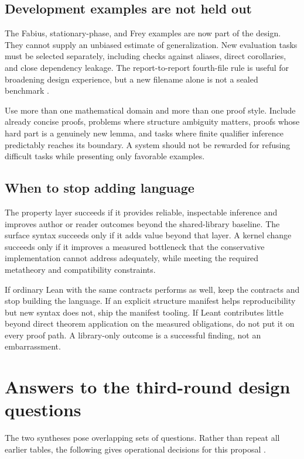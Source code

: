 \documentclass[11pt,a4paper]{article}
\theoremstyle{definition}
\theoremstyle{remark}
\begin{document}
\subsection{Development examples are not held out}
The Fabius, stationary-phase, and Frey examples are now part of the design. They cannot supply an unbiased estimate of generalization. New evaluation tasks must be selected separately, including checks against aliases, direct corollaries, and close dependency leakage. The report-to-report fourth-file rule is useful for broadening design experience, but a new filename alone is not a sealed benchmark \cite{synA,synB}.

Use more than one mathematical domain and more than one proof style. Include already concise proofs, problems where structure ambiguity matters, proofs whose hard part is a genuinely new lemma, and tasks where finite qualifier inference predictably reaches its boundary. A system should not be rewarded for refusing difficult tasks while presenting only favorable examples.

\subsection{When to stop adding language}
The property layer succeeds if it provides reliable, inspectable inference and improves author or reader outcomes beyond the shared-library baseline. The surface syntax succeeds only if it adds value beyond that layer. A kernel change succeeds only if it improves a measured bottleneck that the conservative implementation cannot address adequately, while meeting the required metatheory and compatibility constraints.

If ordinary Lean with the same contracts performs as well, keep the contracts and stop building the language. If an explicit structure manifest helps reproducibility but new syntax does not, ship the manifest tooling. If Leant contributes little beyond direct theorem application on the measured obligations, do not put it on every proof path. A library-only outcome is a successful finding, not an embarrassment.

\section{Answers to the third-round design questions}
\label{sec:answers}

The two syntheses pose overlapping sets of questions. Rather than repeat all earlier tables, the following gives operational decisions for this proposal \cite{synA,synB}.
\end{document}
